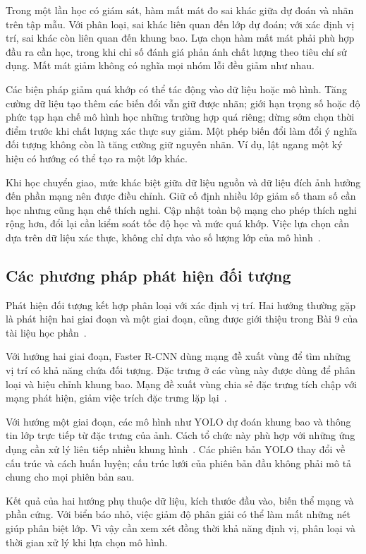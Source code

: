Trong một lần học có giám sát, hàm mất mát đo sai khác giữa dự đoán và nhãn trên tập mẫu. Với phân loại, sai khác liên quan đến lớp dự đoán; với xác định vị trí, sai khác còn liên quan đến khung bao. Lựa chọn hàm mất mát phải phù hợp đầu ra cần học, trong khi chỉ số đánh giá phản ánh chất lượng theo tiêu chí sử dụng. Mất mát giảm không có nghĩa mọi nhóm lỗi đều giảm như nhau.

Các biện pháp giảm quá khớp có thể tác động vào dữ liệu hoặc mô hình. Tăng cường dữ liệu tạo thêm các biến đổi vẫn giữ được nhãn; giới hạn trọng số hoặc độ phức tạp hạn chế mô hình học những trường hợp quá riêng; dừng sớm chọn thời điểm trước khi chất lượng xác thực suy giảm. Một phép biến đổi làm đổi ý nghĩa đối tượng không còn là tăng cường giữ nguyên nhãn. Ví dụ, lật ngang một ký hiệu có hướng có thể tạo ra một lớp khác.

Khi học chuyển giao, mức khác biệt giữa dữ liệu nguồn và dữ liệu đích ảnh hưởng đến phần mạng nên được điều chỉnh. Giữ cố định nhiều lớp giảm số tham số cần học nhưng cũng hạn chế thích nghi. Cập nhật toàn bộ mạng cho phép thích nghi rộng hơn, đổi lại cần kiểm soát tốc độ học và mức quá khớp. Việc lựa chọn cần dựa trên dữ liệu xác thực, không chỉ dựa vào số lượng lớp của mô hình~\cite{stanford_transfer}.

\subsection{Các phương pháp phát hiện đối tượng}
Phát hiện đối tượng kết hợp phân loại với xác định vị trí. Hai hướng thường gặp là phát hiện hai giai đoạn và một giai đoạn, cũng được giới thiệu trong Bài 9 của tài liệu học phần~\cite{tailieu_bai9}.

Với hướng hai giai đoạn, Faster R-CNN dùng mạng đề xuất vùng để tìm những vị trí có khả năng chứa đối tượng. Đặc trưng ở các vùng này được dùng để phân loại và hiệu chỉnh khung bao. Mạng đề xuất vùng chia sẻ đặc trưng tích chập với mạng phát hiện, giảm việc trích đặc trưng lặp lại~\cite{ren2015faster}.

Với hướng một giai đoạn, các mô hình như YOLO dự đoán khung bao và thông tin lớp trực tiếp từ đặc trưng của ảnh. Cách tổ chức này phù hợp với những ứng dụng cần xử lý liên tiếp nhiều khung hình~\cite{redmon2016yolo,sapkota2025yolo}. Các phiên bản YOLO thay đổi về cấu trúc và cách huấn luyện; cấu trúc lưới của phiên bản đầu không phải mô tả chung cho mọi phiên bản sau.

Kết quả của hai hướng phụ thuộc dữ liệu, kích thước đầu vào, biến thể mạng và phần cứng. Với biển báo nhỏ, việc giảm độ phân giải có thể làm mất những nét giúp phân biệt lớp. Vì vậy cần xem xét đồng thời khả năng định vị, phân loại và thời gian xử lý khi lựa chọn mô hình.

